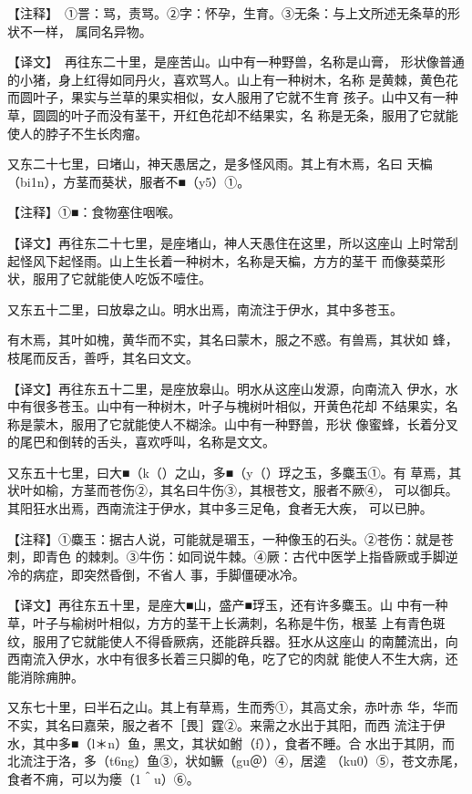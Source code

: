 \documentclass[a4paper,12pt,UTF8,twoside]{ctexbook}
\begin{document}
【注释】　①詈：骂，责骂。②字：怀孕，生育。③无条：与上文所述无条草的形状不一样， 属同名异物。

【译文】　再往东二十里，是座苦山。山中有一种野兽，名称是山膏， 形状像普通的小猪，身上红得如同丹火，喜欢骂人。山上有一种树木，名称 是黄棘，黄色花而圆叶子，果实与兰草的果实相似，女人服用了它就不生育 孩子。山中又有一种草，圆圆的叶子而没有茎干，开红色花却不结果实，名 称是无条，服用了它就能使人的脖子不生长肉瘤。

又东二十七里，曰堵山，神天愚居之，是多怪风雨。其上有木焉，名曰 天楄（bi1n），方茎而葵状，服者不■（y5）①。

【注释】①■：食物塞住咽喉。

【译文】再往东二十七里，是座堵山，神人天愚住在这里，所以这座山 上时常刮起怪风下起怪雨。山上生长着一种树木，名称是天楄，方方的茎干 而像葵菜形状，服用了它就能使人吃饭不噎住。

又东五十二里，曰放皋之山。明水出焉，南流注于伊水，其中多苍玉。

有木焉，其叶如槐，黄华而不实，其名曰蒙木，服之不惑。有兽焉，其状如 蜂，枝尾而反舌，善呼，其名曰文文。

【译文】再往东五十二里，是座放皋山。明水从这座山发源，向南流入 伊水，水中有很多苍玉。山中有一种树木，叶子与槐树叶相似，开黄色花却 不结果实，名称是蒙木，服用了它就能使人不糊涂。山中有一种野兽，形状 像蜜蜂，长着分叉的尾巴和倒转的舌头，喜欢呼叫，名称是文文。

又东五十七里，曰大■（k（）之山，多■（y（）琈之玉，多麋玉①。有 草焉，其状叶如榆，方茎而苍伤②，其名曰牛伤③，其根苍文，服者不厥④， 可以御兵。其阳狂水出焉，西南流注于伊水，其中多三足龟，食者无大疾， 可以已肿。

【注释】①麋玉：据古人说，可能就是瑂玉，一种像玉的石头。②苍伤：就是苍刺，即青色 的棘刺。③牛伤：如同说牛棘。④厥：古代中医学上指昏厥或手脚逆冷的病症，即突然昏倒，不省人 事，手脚僵硬冰冷。

【译文】再往东五十里，是座大■山，盛产■琈玉，还有许多麋玉。山 中有一种草，叶子与榆树叶相似，方方的茎干上长满刺，名称是牛伤，根茎 上有青色斑纹，服用了它就能使人不得昏厥病，还能辟兵器。狂水从这座山 的南麓流出，向西南流入伊水，水中有很多长着三只脚的龟，吃了它的肉就 能使人不生大病，还能消除痈肿。

又东七十里，曰半石之山。其上有草焉，生而秀①，其高丈余，赤叶赤 华，华而不实，其名曰嘉荣，服之者不［畏］霆②。来需之水出于其阳，而西 流注于伊水，其中多■（l＊n）鱼，黑文，其状如鲋（f）），食者不睡。合 水出于其阴，而北流注于洛，多（t6ng）鱼③，状如鳜（gu＠）④，居逵 （ku0）⑤，苍文赤尾，食者不痈，可以为瘘（1＾u）⑥。
\end{document}

